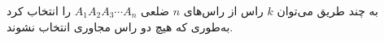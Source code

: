 \EXERCISE
به چند طریق می‌توان
$k$
راس از راس‌های
$n$
ضلعی
$A_1 A_2 A_3 \cdots A_n$
را انتخاب کرد به‌طوری که هیچ دو راس مجاوری انتخاب نشوند.
